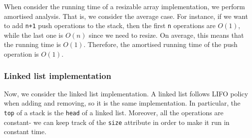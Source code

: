 \documentclass[a4paper, openany]{memoir}
\begin{document}
When consider the running time of a resizable array implementation, we perform amortised analysis. That is, we consider the average case. For instance, if we want to add \texttt{n+1} push operations to the stack, then the first \texttt{n} operations are $O(1)$, while the last one is $O(n)$ since we need to resize. On average, this means that the running time is $O(1)$. Therefore, the amortised running time of the push operation is $O(1)$.

\subsubsection{Linked list implementation}
\noindent Now, we consider the linked list implementation. A linked list follows LIFO policy when adding and removing, so it is the same implementation. In particular, the \texttt{top} of a stack is the \texttt{head} of a linked list. Moreover, all the operations are constant- we can keep track of the \texttt{size} attribute in order to make it run in constant time.
\end{document}
